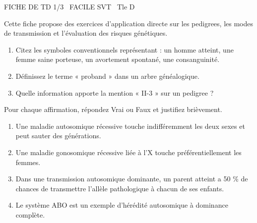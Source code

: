 \documentclass[11pt]{article}
\begin{document}
\begin{tcolorbox}[enhanced,colback=popink,colframe=popink,arc=10pt,boxrule=0pt,left=12pt,right=12pt,top=9pt,bottom=9pt]
{\color{white}\popxbold\small FICHE DE TD 1/3 \textbullet\ FACILE \hfill SVT \textbullet\ Tle D\par}
\end{tcolorbox}
\vspace{4pt}
Cette fiche propose des exercices d'application directe sur les pedigrees, les modes de transmission et l'évaluation des risques génétiques.

\begin{exercice}
\begin{enumerate}
    \item Citez les symboles conventionnels représentant : un homme atteint, une femme saine porteuse, un avortement spontané, une consanguinité.
    \item Définissez le terme « proband » dans un arbre généalogique.
    \item Quelle information apporte la mention « II-3 » sur un pedigree ?
\end{enumerate}
\end{exercice}

\begin{exercice}
Pour chaque affirmation, répondez Vrai ou Faux et justifiez brièvement.
\begin{enumerate}
    \item Une maladie autosomique récessive touche indifféremment les deux sexes et peut sauter des générations.
    \item Une maladie gonosomique récessive liée à l'X touche préférentiellement les femmes.
    \item Dans une transmission autosomique dominante, un parent atteint a 50 \% de chances de transmettre l'allèle pathologique à chacun de ses enfants.
    \item Le système ABO est un exemple d'hérédité autosomique à dominance complète.
\end{enumerate}
\end{exercice}
\end{document}
